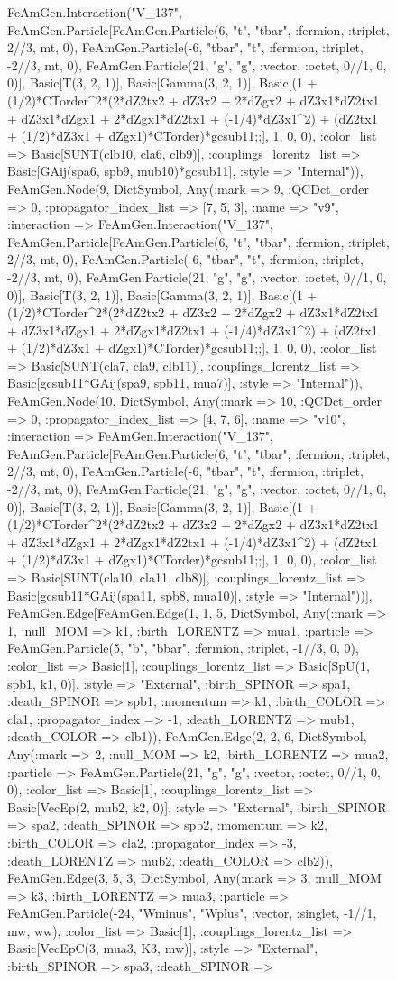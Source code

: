 \documentclass{revtex4}
\begin{document}
\begin{figure}[!htb]
\begin{center}
{FeAmGen.Interaction("V_137", FeAmGen.Particle[FeAmGen.Particle(6, "t", "tbar", :fermion, :triplet, 2//3, mt, 0), FeAmGen.Particle(-6, "tbar", "t", :fermion, :triplet, -2//3, mt, 0), FeAmGen.Particle(21, "g", "g", :vector, :octet, 0//1, 0, 0)], Basic[T(3, 2, 1)], Basic[Gamma(3, 2, 1)], Basic[(1 + (1/2)*CTorder^2*(2*dZ2tx2 + dZ3x2 + 2*dZgx2 + dZ3x1*dZ2tx1 + dZ3x1*dZgx1 + 2*dZgx1*dZ2tx1 + (-1/4)*dZ3x1^2) + (dZ2tx1 + (1/2)*dZ3x1 + dZgx1)*CTorder)*gcsub11;;], 1, 0, 0), :color_list => Basic[SUNT(clb10, cla6, clb9)], :couplings_lorentz_list => Basic[GAij(spa6, spb9, mub10)*gcsub11], :style => "Internal")), FeAmGen.Node(9, Dict{Symbol, Any}(:mark => 9, :QCDct_order => 0, :propagator_index_list => [7, 5, 3], :name => "v9", :interaction => FeAmGen.Interaction("V_137", FeAmGen.Particle[FeAmGen.Particle(6, "t", "tbar", :fermion, :triplet, 2//3, mt, 0), FeAmGen.Particle(-6, "tbar", "t", :fermion, :triplet, -2//3, mt, 0), FeAmGen.Particle(21, "g", "g", :vector, :octet, 0//1, 0, 0)], Basic[T(3, 2, 1)], Basic[Gamma(3, 2, 1)], Basic[(1 + (1/2)*CTorder^2*(2*dZ2tx2 + dZ3x2 + 2*dZgx2 + dZ3x1*dZ2tx1 + dZ3x1*dZgx1 + 2*dZgx1*dZ2tx1 + (-1/4)*dZ3x1^2) + (dZ2tx1 + (1/2)*dZ3x1 + dZgx1)*CTorder)*gcsub11;;], 1, 0, 0), :color_list => Basic[SUNT(cla7, cla9, clb11)], :couplings_lorentz_list => Basic[gcsub11*GAij(spa9, spb11, mua7)], :style => "Internal")), FeAmGen.Node(10, Dict{Symbol, Any}(:mark => 10, :QCDct_order => 0, :propagator_index_list => [4, 7, 6], :name => "v10", :interaction => FeAmGen.Interaction("V_137", FeAmGen.Particle[FeAmGen.Particle(6, "t", "tbar", :fermion, :triplet, 2//3, mt, 0), FeAmGen.Particle(-6, "tbar", "t", :fermion, :triplet, -2//3, mt, 0), FeAmGen.Particle(21, "g", "g", :vector, :octet, 0//1, 0, 0)], Basic[T(3, 2, 1)], Basic[Gamma(3, 2, 1)], Basic[(1 + (1/2)*CTorder^2*(2*dZ2tx2 + dZ3x2 + 2*dZgx2 + dZ3x1*dZ2tx1 + dZ3x1*dZgx1 + 2*dZgx1*dZ2tx1 + (-1/4)*dZ3x1^2) + (dZ2tx1 + (1/2)*dZ3x1 + dZgx1)*CTorder)*gcsub11;;], 1, 0, 0), :color_list => Basic[SUNT(cla10, cla11, clb8)], :couplings_lorentz_list => Basic[gcsub11*GAij(spa11, spb8, mua10)], :style => "Internal"))], FeAmGen.Edge[FeAmGen.Edge(1, 1, 5, Dict{Symbol, Any}(:mark => 1, :null_MOM => k1, :birth_LORENTZ => mua1, :particle => FeAmGen.Particle(5, "b", "bbar", :fermion, :triplet, -1//3, 0, 0), :color_list => Basic[1], :couplings_lorentz_list => Basic[SpU(1, spb1, k1, 0)], :style => "External", :birth_SPINOR => spa1, :death_SPINOR => spb1, :momentum => k1, :birth_COLOR => cla1, :propagator_index => -1, :death_LORENTZ => mub1, :death_COLOR => clb1)), FeAmGen.Edge(2, 2, 6, Dict{Symbol, Any}(:mark => 2, :null_MOM => k2, :birth_LORENTZ => mua2, :particle => FeAmGen.Particle(21, "g", "g", :vector, :octet, 0//1, 0, 0), :color_list => Basic[1], :couplings_lorentz_list => Basic[VecEp(2, mub2, k2, 0)], :style => "External", :birth_SPINOR => spa2, :death_SPINOR => spb2, :momentum => k2, :birth_COLOR => cla2, :propagator_index => -3, :death_LORENTZ => mub2, :death_COLOR => clb2)), FeAmGen.Edge(3, 5, 3, Dict{Symbol, Any}(:mark => 3, :null_MOM => k3, :birth_LORENTZ => mua3, :particle => FeAmGen.Particle(-24, "Wminus", "Wplus", :vector, :singlet, -1//1, mw, ww), :color_list => Basic[1], :couplings_lorentz_list => Basic[VecEpC(3, mua3, K3, mw)], :style => "External", :birth_SPINOR => spa3, :death_SPINOR => }
\end{center}
\end{figure}
\end{document}
